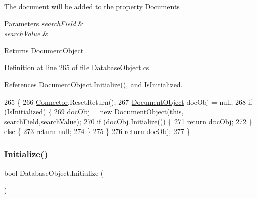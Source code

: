 The document will be added to the property \textquotesingle{}Documents\textquotesingle{}


\begin{DoxyParams}{Parameters}
{\em search\+Field} & \\
\hline
{\em search\+Value} & \\
\hline
\end{DoxyParams}
\begin{DoxyReturn}{Returns}
\mbox{\hyperlink{class_document_object}{Document\+Object}}
\end{DoxyReturn}


Definition at line 265 of file Database\+Object.\+cs.



References Document\+Object.\+Initialize(), and Is\+Initialized.


\begin{DoxyCode}
265                                                                                    \{
266         \mbox{\hyperlink{class_connector}{Connector}}.ResetReturn();
267         \mbox{\hyperlink{class_document_object}{DocumentObject}} docObj = null;
268         \textcolor{keywordflow}{if} (\mbox{\hyperlink{class_database_object_a5fe036d32a30eb10d1b3f6a30263f740}{IsInitialized}}) \{
269             docObj = \textcolor{keyword}{new} \mbox{\hyperlink{class_document_object}{DocumentObject}}(\textcolor{keyword}{this}, searchField,searchValue);
270             \textcolor{keywordflow}{if} (docObj.\mbox{\hyperlink{class_document_object_af4298d6cfbb9ea60643d9995309b73f1}{Initialize}}()) \{
271                 \textcolor{keywordflow}{return} docObj;
272             \} \textcolor{keywordflow}{else} \{
273                 \textcolor{keywordflow}{return} null;
274             \}
275         \}
276         \textcolor{keywordflow}{return} docObj;
277     \}
\end{DoxyCode}
\mbox{\label{class_database_object_a7de43a21bd287deec537cffec343f41d}} 
\subsubsection{\texorpdfstring{Initialize()}{Initialize()}}
{\footnotesize\ttfamily bool Database\+Object.\+Initialize (\begin{DoxyParamCaption}{ }\end{DoxyParamCaption})}



